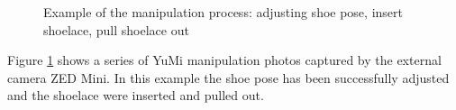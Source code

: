 \begin{figure}[H]

\caption{Example of the manipulation process: adjusting shoe pose, insert shoelace, pull shoelace out}
\label{integratedtestfig}
\end{figure}

Figure \ref{integratedtestfig} shows a series of YuMi manipulation photos captured by the external camera ZED Mini. In this example the shoe pose has been successfully adjusted and the shoelace were inserted and pulled out.
